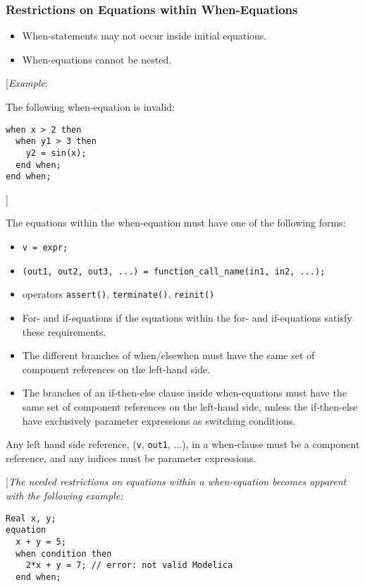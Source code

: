 \subsubsection{Restrictions on Equations within When-Equations}

\begin{itemize}
\item
  When-statements may not occur inside initial equations.
\item
  When-equations cannot be nested.
\end{itemize}

{[}\emph{Example}:

The following when-equation is invalid:
\begin{lstlisting}[language=modelica]
when x > 2 then
  when y1 > 3 then
    y2 = sin(x);
  end when;
end when;
\end{lstlisting}

{]}

The equations within the when-equation must have one of the following
forms:

\begin{itemize}
\item \lstinline!v = expr;!
\item \lstinline!(out1, out2, out3, ...) = function_call_name(in1, in2, ...);!
\item
  operators \lstinline!assert()!, \lstinline!terminate()!, \lstinline!reinit()!
\item
  For- and if-equations if the equations within the for- and
  if-equations satisfy these requirements.
\item
  The different branches of when/elsewhen must have the same set of
  component references on the left-hand side.
\item
  The branches of an if-then-else clause inside when-equations must have
  the same set of component references on the left-hand side, unless the
  if-then-else have exclusively parameter expressions as switching
  conditions.
\end{itemize}

Any left hand side reference, (\lstinline!v!, \lstinline!out1!, ...), in a when-clause must
be a component reference, and any indices must be parameter expressions.

{[}\emph{The needed restrictions on equations within a when-equation
becomes apparent with the following example: }

\begin{lstlisting}[language=modelica]
  Real x, y;
equation
  x + y = 5;
  when condition then
    2*x + y = 7; // error: not valid Modelica
  end when;
\end{lstlisting}

